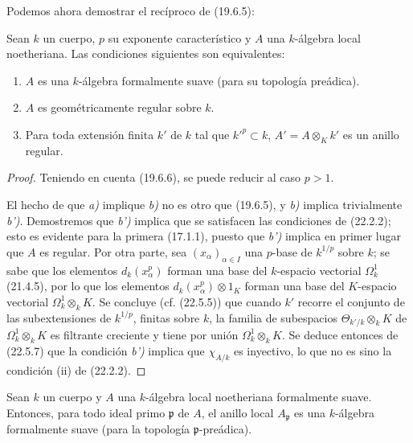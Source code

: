 Podemos ahora demostrar el recíproco de (19.6.5):

\begin{theorem}[22.5.8]
\label{0.22.5.8-fr}
Sean $k$ un cuerpo, $p$ su exponente característico y $A$ una $k$-álgebra
local noetheriana. Las condiciones siguientes son equivalentes:
\begin{enumerate}
  \item[\textup{a)}] $A$ es una $k$-álgebra formalmente suave (para su topología
  preádica).
  \item[\textup{b)}] $A$ es geométricamente regular sobre $k$.
  \item[\textup{b')}] Para toda extensión finita $k'$ de $k$ tal que $k'^p\subset k$,
  $A'=A\otimes_Kk'$ es un anillo regular.
\end{enumerate}
\end{theorem}

\begin{proof}
Teniendo en cuenta (19.6.6), se puede reducir al caso $p>1$.

El hecho de que \emph{a)} implique \emph{b)} no es otro que (19.6.5), y \emph{b)} implica
trivialmente \emph{b')}. Demostremos que \emph{b')} implica que se satisfacen las condiciones de
(22.2.2); esto es evidente para la primera (17.1.1), puesto que \emph{b')} implica
en primer lugar que $A$ es regular. Por otra parte, sea $(x_\alpha)_{\alpha\in I}$ una
$p$-base de $k^{1/p}$ sobre $k$; se sabe que los elementos $d_k(x_\alpha^p)$
forman una base del $k$-espacio vectorial $\Omega^1_k$ (21.4.5), por lo que los
elementos $d_k(x_\alpha^p)\otimes1_K$ forman una base del $K$-espacio vectorial
$\Omega^1_k\otimes_kK$. Se concluye (cf. (22.5.5)) que cuando $k'$ recorre
el conjunto de las subextensiones de $k^{1/p}$, finitas sobre $k$, la familia de
subespacios $\Theta_{k'/k}\otimes_kK$ de $\Omega^1_k\otimes_kK$ es filtrante
creciente y tiene por unión $\Omega^1_k\otimes_kK$. Se deduce entonces de
(22.5.7) que la condición \emph{b')} implica que $\chi_{A/k}$ es inyectivo, lo que
no es sino la condición (ii) de (22.2.2).
\end{proof}

\begin{corollary}[22.5.9]
\label{0.22.5.9-fr}
Sean $k$ un cuerpo y $A$ una $k$-álgebra local noetheriana formalmente
suave. Entonces, para todo ideal primo $\mathfrak p$ de $A$, el anillo local
$A_{\mathfrak p}$ es una $k$-álgebra formalmente suave (para la topología
$\mathfrak p$-preádica).
\end{corollary}

